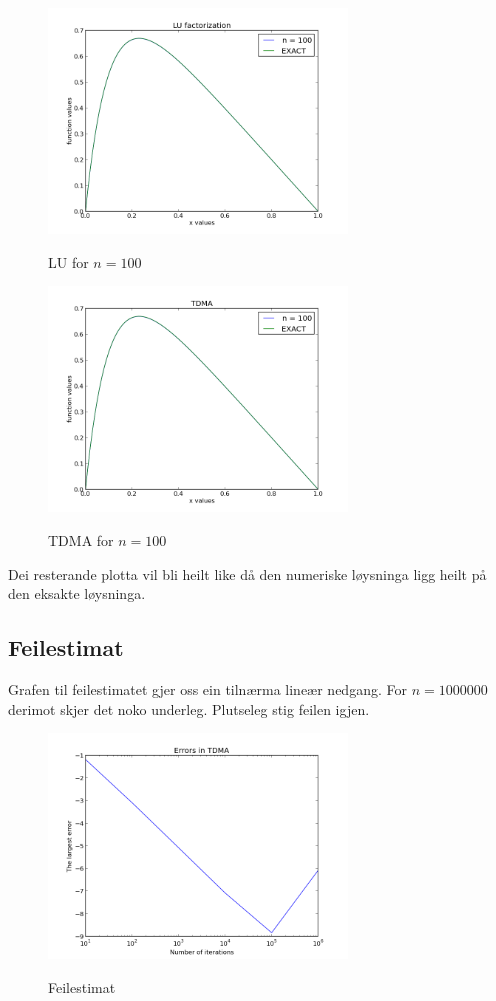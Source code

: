 \documentclass[11pt, a4paper]{article}
\begin{document}
    \begin{figure}[H]
      \centering
      \includegraphics[width=300px]{LU100.png} \\
      \caption{LU for $n = 100$}
    \end{figure}
    \begin{figure}[H]
      \centering
      \includegraphics[width=300px]{TDMA100.png} \\
      \caption{TDMA for $n = 100$}
    \end{figure}

    Dei resterande plotta vil bli heilt like då den numeriske løysninga ligg heilt på den 
    eksakte løysninga.

  \subsection{Feilestimat}
    Grafen til feilestimatet gjer oss ein tilnærma lineær nedgang. For $n = 1000000$ derimot skjer 
    det noko underleg. Plutseleg stig feilen igjen. 

    \begin{figure}[H]
      \centering
      \includegraphics[width=300px]{ERROR.png} \\
      \caption{Feilestimat}
    \end{figure}
\end{document}
